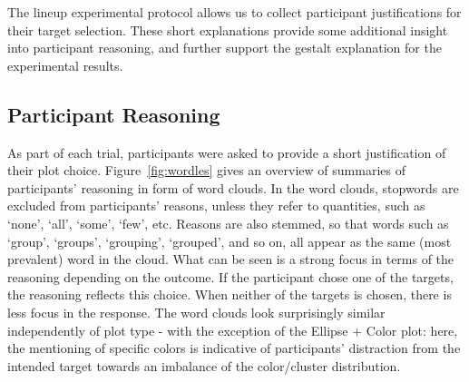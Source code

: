 \documentclass[12pt]{article}\usepackage[]{graphicx}\usepackage[]{color}
\begin{document}
The lineup experimental protocol allows us to collect participant justifications for their target selection. 
These short explanations provide some additional insight into participant reasoning, and further support the gestalt explanation for the experimental results. 


\subsection{Participant Reasoning}\label{sec:sentiment}
As part of each trial, participants were asked to provide a short justification of their plot choice. Figure~\ref{fig:wordles} gives an overview of summaries of participants' reasoning in form of word clouds. In the word clouds, stopwords are excluded from participants' reasons, unless they refer to quantities, such as `none', `all', `some', `few', etc. Reasons are also stemmed, so that words such as `group', `groups', `grouping', `grouped', and so on, all appear as the same (most prevalent) word in the cloud. What can be seen is a strong focus in terms of the reasoning depending on the outcome. If the participant chose one of the targets, the reasoning reflects this choice. When neither of the targets is chosen, there is less focus in the response. The word clouds look surprisingly similar independently of plot type - with the exception of the Ellipse + Color plot: here, the mentioning of specific colors is indicative of participants' distraction from the intended target towards an imbalance of the color/cluster distribution. 
\end{document}

